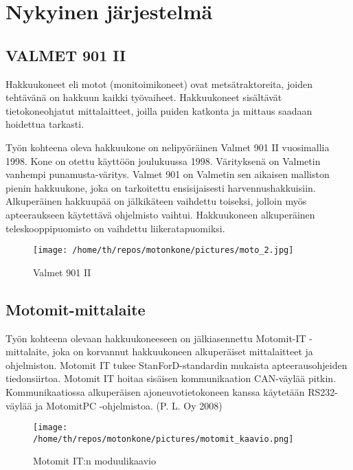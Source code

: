 \documentclass[11pt,a4paper,oneside,article]{memoir}
\begin{document}
\newpage

\chapter{Nykyinen järjestelmä}

\section{VALMET 901 II}

Hakkuukoneet eli motot (monitoimikoneet) ovat metsätraktoreita, joiden tehtävänä on hakkuun kaikki työvaiheet. Hakkuukoneet sisältävät tietokoneohjatut mittalaitteet, joilla puiden katkonta ja mittaus saadaan hoidettua tarkasti.

Työn kohteena oleva hakkuukone on nelipyöräinen Valmet 901 II vuosimallia 1998. Kone on otettu käyttöön joulukuussa 1998. Värityksenä on Valmetin vanhempi punamusta-väritys. Valmet 901 on Valmetin sen aikaisen malliston pienin hakkuukone, joka on tarkoitettu ensisijaisesti harvennushakkuisiin. Alkuperäinen hakkuupää on jälkikäteen vaihdettu toiseksi, jolloin myös apteeraukseen käytettävä ohjelmisto vaihtui. Hakkuukoneen alkuperäinen teleskooppipuomisto on vaihdettu liikeratapuomiksi.
\newline

\begin{figure}[H]
\centering
\texttt{[image: /home/th/repos/motonkone/pictures/moto\_2.jpg]}
\caption{Valmet 901 II}
\end{figure}

\section{Motomit-mittalaite}

Työn kohteena olevaan hakkuukoneeseen on jälkiasennettu Motomit-IT
-mittalaite, joka on korvannut hakkuukoneen alkuperäiset mittalaitteet
ja ohjelmiston. Motomit IT tukee StanForD-standardin mukaista
apteerausohjeiden tiedonsiirtoa. Motomit IT hoitaa sisäisen
kommunikaation CAN-väylää pitkin. Kommunikaatiossa alkuperäisen
ajoneuvotietokoneen kanssa käytetään RS232-väylää ja MotomitPC
-ohjelmistoa. (P. L. Oy 2008)
\newline

\begin{figure}[H]
\centering
\texttt{[image: /home/th/repos/motonkone/pictures/motomit\_kaavio.png]}
\caption{Motomit IT:n moduulikaavio}
\end{figure}
\newpage
\end{document}
